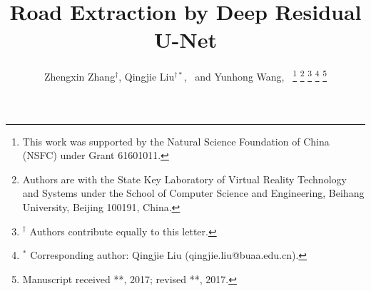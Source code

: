 \documentclass[journal]{IEEEtran}
\begin{document}
%
\title{Road Extraction by Deep Residual U-Net}
%
%
%

\author{Zhengxin Zhang$^{\dagger}$, %
	Qingjie Liu$^{\dagger *}$,~
	and Yunhong Wang,~
\thanks{This work was supported by the Natural Science Foundation of China (NSFC) under Grant 61601011.}
\thanks{Authors are with the State Key Laboratory of Virtual Reality Technology and Systems under the School of Computer Science and Engineering, Beihang University, Beijing 100191, China.}
\thanks{$^{\dagger}$ Authors contribute equally to this letter. }
\thanks{$^{*}$ Corresponding author: Qingjie Liu (qingjie.liu@buaa.edu.cn).}
\thanks{Manuscript received **, 2017; revised **, 2017.}
}

%
%
\end{document}
